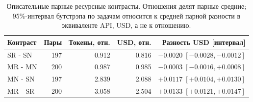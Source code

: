 \begin{table}[htbp]\centering\small
\caption{Описательные парные ресурсные контрасты. Отношения делят парные средние; 95\%-интервал бутстрэпа по задачам относится к средней парной разности в эквиваленте API, USD, а не к отношению.}\label{tab:heldout-resource-contrasts}
\begin{tabular}{lrrrr}\toprule
Контраст & Пары & Токены, отн. & USD, отн. & Разность USD [интервал]\\
\midrule
SR - SN & 197 & 0.912 & 0.816 & $-0.0020\;[-0.0028,-0.0012]$\\
MR - MN & 200 & 0.987 & 0.985 & $-0.0003\;[-0.0016,+0.0008]$\\
MN - SN & 197 & 2.839 & 2.088 & $+0.0117\;[+0.0104,+0.0130]$\\
MR - SR & 200 & 3.058 & 2.504 & $+0.0133\;[+0.0121,+0.0147]$\\
\bottomrule\end{tabular}\end{table}
